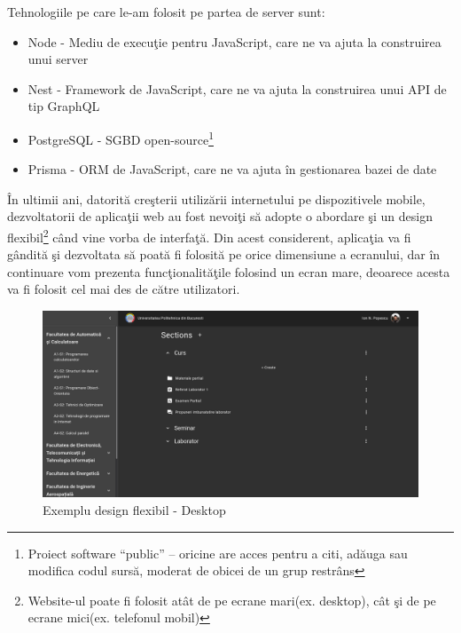 \documentclass[12pt, a4paper, oneside, romanian]{teza-upb}
\begin{document}
Tehnologiile pe care le-am folosit pe partea de server sunt:
\begin{itemize}
	\item Node\cite{documentatienode} - Mediu de execuţie pentru JavaScript, care ne va ajuta la construirea unui server
	\item Nest\cite{documentatienest} - Framework de JavaScript, care ne va ajuta la construirea unui API de tip GraphQL
	\item PostgreSQL\cite{documentatiepostgresql} - SGBD open-source\footnote{Proiect software ``public'' -- oricine are acces pentru a citi, adăuga sau modifica codul sursă, moderat de obicei de un grup restrâns}
	\item Prisma\cite{documentatieprisma} - ORM de JavaScript, care ne va ajuta în gestionarea bazei de date
\end{itemize}

În ultimii ani, datorită creşterii utilizării internetului pe dispozitivele mobile, dezvoltatorii de aplicaţii web au fost nevoiţi să adopte o abordare şi un design flexibil\footnote{Website-ul poate fi folosit atât de pe ecrane mari(ex. desktop), cât şi de pe ecrane mici(ex. telefonul mobil)} când vine vorba de interfaţă. Din acest considerent, aplicaţia va fi gândită şi dezvoltata să poată fi folosită pe orice dimensiune a ecranului, dar în continuare vom prezenta funcţionalităţile folosind un ecran mare, deoarece acesta va fi folosit cel mai des de către utilizatori.\cite{designflexibil}

\begin{figure}[H]
\centering
\includegraphics*[width=\columnwidth]{exemplu-design-responsive-desktop}
\caption{Exemplu design flexibil - Desktop}
\label{exemplu-design-responsive-desktop}
\end{figure}
\end{document}
